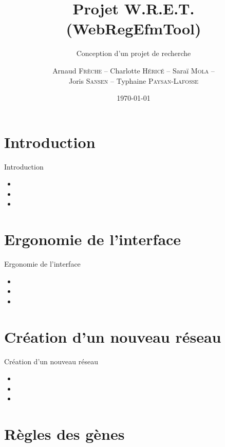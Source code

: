 \documentclass{beamer}
\title{\textcolor{bleu2}{\textbf{Projet W.R.E.T. (WebRegEfmTool)}}}
\subtitle{\textcolor{bleu1}{Conception d'un projet de recherche}}
\author[]{Arnaud \textsc{Frèche} -- Charlotte \textsc{Héricé} -- Saraï \textsc{Mola} -- \\ Joris \textsc{Sansen} -- Typhaine \textsc{Paysan-Lafosse}}
\institute{Master 2 BioInformatique}
\date{\today}
\begin{document}
\frame{\titlepage}
\frame{\tableofcontents}

\section{Introduction}

\begin{frame}{\textcolor{bleu2}{Introduction}}
	\begin{itemize}
	\item 
	\item 
	\item 
	\end{itemize}
\end{frame}

\section{Ergonomie de l'interface}

\begin{frame}{\textcolor{bleu2}{Ergonomie de l'interface}}
	\begin{itemize}
	\item 
	\item 
	\item 
	\end{itemize}
\end{frame}

\section{Création d'un nouveau réseau}

\begin{frame}{\textcolor{bleu2}{Création d'un nouveau réseau}}
	\begin{itemize}
	\item 
	\item 
	\item 
	\end{itemize}
\end{frame}

\section{Règles des gènes}
\end{document}
